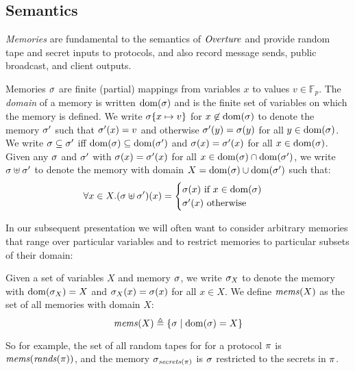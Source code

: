\subsection{Semantics}
\label{section-lang-semantics}

\minicatredxfig

\emph{Memories} are fundamental to the semantics of $\mathit{Overture}$ and
provide random tape and secret inputs to protocols, and also record
message sends, public broadcast, and client outputs.
\begin{definition}
Memories $\sigma$ are finite (partial) mappings from variables $x$ to
values $v \in \mathbb{F}_p$.  The \emph{domain} of a memory is written
$\mathrm{dom}(\sigma)$ and is the finite set of variables on which the memory
is defined.  We write $\sigma\{ x \mapsto v\}$ for
$x\not\in\mathrm{dom}(\sigma)$ to denote the memory $\sigma'$ such that
$\sigma'(x) = v$ and otherwise $\sigma'(y) = \sigma(y)$ for all $y \in
\mathrm{dom}(\sigma)$. We write $\sigma \subseteq \sigma'$ iff $\mathrm{dom}(\sigma)
\subseteq \mathrm{dom}(\sigma')$ and $\sigma(x) = \sigma'(x)$ for all $x \in
\mathrm{dom}(\sigma)$. Given any $\sigma$ and $\sigma'$ with $\sigma(x) =
\sigma'(x)$ for all $x \in \mathrm{dom}(\sigma) \cap \mathrm{dom}(\sigma')$, we write
$\sigma \uplus \sigma'$ to denote the memory with domain $X =
\mathrm{dom}(\sigma) \cup \mathrm{dom}(\sigma')$ such that:
$$
\forall x \in X .
(\sigma \uplus \sigma')(x) =
\begin{cases} \sigma(x) \text{\ if\ } x\in\mathrm{dom}(\sigma) \\ \sigma'(x) \text{\ otherwise\ }\end{cases} 
$$
\end{definition}
In our subsequent presentation we will often want to consider arbitrary
memories that range over particular variables and to restrict
memories to particular subsets of their domain:
\begin{definition}
  Given a set of variables $X$ and memory $\sigma$, we write
  $\sigma_X$ to denote the memory with $\mathrm{dom}(\sigma_X) = X$ and
  $\sigma_X(x) = \sigma(x)$ for all $x \in X$. We define $\mathit{mems}(X)$ as
  the set of all memories with domain $X$:
  $$
  \mathit{mems}(X) \triangleq \{ \sigma \mid \mathrm{dom}(\sigma) = X \}
  $$
\end{definition}
So for example, the set of all random tapes for
for a protocol $\pi$ is $\mathit{mems}(\mathit{rands}(\pi))$, and the memory $\sigma_{\mathit{secrets}(\pi)}$
is $\sigma$ restricted to the secrets in $\pi$.

